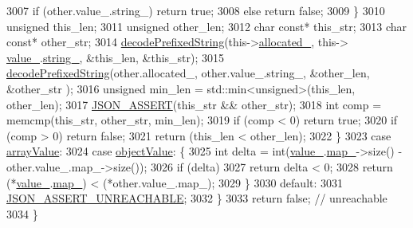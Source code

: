 \begin{DoxyCode}
3007       \textcolor{keywordflow}{if} (other.value\_.string\_) \textcolor{keywordflow}{return} \textcolor{keyword}{true};
3008       \textcolor{keywordflow}{else} \textcolor{keywordflow}{return} \textcolor{keyword}{false};
3009     \}
3010     \textcolor{keywordtype}{unsigned} this\_len;
3011     \textcolor{keywordtype}{unsigned} other\_len;
3012     \textcolor{keywordtype}{char} \textcolor{keyword}{const}* this\_str;
3013     \textcolor{keywordtype}{char} \textcolor{keyword}{const}* other\_str;
3014     \hyperlink{namespace_json_aad8b4982c1acd164f541fba396ac9fb1}{decodePrefixedString}(this->\hyperlink{class_json_1_1_value_ae0126c80dc4907aad94088553fc7632b}{allocated\_}, this->
      \hyperlink{class_json_1_1_value_aef578244546212705b9f81eb84d7e151}{value\_}.\hyperlink{union_json_1_1_value_1_1_value_holder_a70ac2b153bc405527baa3850d2ddc3cb}{string\_}, &this\_len, &this\_str);
3015     \hyperlink{namespace_json_aad8b4982c1acd164f541fba396ac9fb1}{decodePrefixedString}(other.allocated\_, other.value\_.string\_, &other\_len, &other\_str
      );
3016     \textcolor{keywordtype}{unsigned} min\_len = std::min<unsigned>(this\_len, other\_len);
3017     \hyperlink{json_8h_a188941dcc789ccb6539c3d6f41405582}{JSON\_ASSERT}(this\_str && other\_str);
3018     \textcolor{keywordtype}{int} comp = memcmp(this\_str, other\_str, min\_len);
3019     \textcolor{keywordflow}{if} (comp < 0) \textcolor{keywordflow}{return} \textcolor{keyword}{true};
3020     \textcolor{keywordflow}{if} (comp > 0) \textcolor{keywordflow}{return} \textcolor{keyword}{false};
3021     \textcolor{keywordflow}{return} (this\_len < other\_len);
3022   \}
3023   \textcolor{keywordflow}{case} \hyperlink{namespace_json_a7d654b75c16a57007925868e38212b4eadc8f264f36b55b063c78126b335415f4}{arrayValue}:
3024   \textcolor{keywordflow}{case} \hyperlink{namespace_json_a7d654b75c16a57007925868e38212b4eae8386dcfc36d1ae897745f7b4f77a1f6}{objectValue}: \{
3025     \textcolor{keywordtype}{int} delta = int(\hyperlink{class_json_1_1_value_aef578244546212705b9f81eb84d7e151}{value\_}.\hyperlink{union_json_1_1_value_1_1_value_holder_a1e7a5b86d4f52234f55c847ad1ce389a}{map\_}->size() - other.value\_.map\_->size());
3026     \textcolor{keywordflow}{if} (delta)
3027       \textcolor{keywordflow}{return} delta < 0;
3028     \textcolor{keywordflow}{return} (*\hyperlink{class_json_1_1_value_aef578244546212705b9f81eb84d7e151}{value\_}.\hyperlink{union_json_1_1_value_1_1_value_holder_a1e7a5b86d4f52234f55c847ad1ce389a}{map\_}) < (*other.value\_.map\_);
3029   \}
3030   \textcolor{keywordflow}{default}:
3031     \hyperlink{jsoncpp_8cpp_aa5e619e3e9388f6376a344dd8462c9cc}{JSON\_ASSERT\_UNREACHABLE};
3032   \}
3033   \textcolor{keywordflow}{return} \textcolor{keyword}{false}; \textcolor{comment}{// unreachable}
3034 \}
\end{DoxyCode}
\mbox{\label{class_json_1_1_value_a40c411a320a416d5eac0052b36211286}} 
